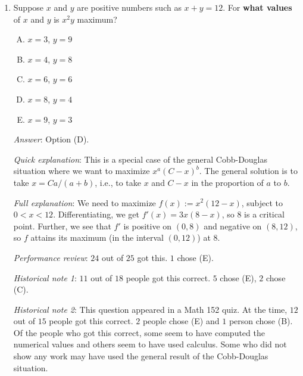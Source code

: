 \documentclass[10pt]{amsart}
\begin{document}
\begin{enumerate}
  {\em Performance review}: $15$ out of $25$ got this. $6$ chose (C),
  $2$ each chose (D) and (E).

  {\em Historical note 1}: $7$ out of $18$ people got this
  correct. $7$ chose (E), $2$ each chose (C) and (D).

  {\em Historical note 2}: This question appeared in a Math 152 quiz,
  and at the time $9$ out of $15$ people got this correct. $2$ people
  each chose (E) and (C), $1$ person chose (D), and $1$ person left
  the question blank.

  {\em Historical note 3}: This question appeared in a 152 midterm
  last year, and $20$ of $29$ people got it correct. In that midterm,
  option (E) wasn't there, so things became a little easier.


\item Suppose $x$ and $y$ are positive numbers such as $x + y =
  12$. For {\bf what values} of $x$ and $y$ is $x^2y$ maximum?

  \begin{enumerate}[(A)]
  \item $x = 3$, $y = 9$
  \item $x = 4$, $y = 8$
  \item $x = 6$, $y = 6$
  \item $x = 8$, $y = 4$
  \item $x = 9$, $y = 3$
  \end{enumerate}

  {\em Answer}: Option (D).

  {\em Quick explanation}: This is a special case of the general
  Cobb-Douglas situation where we want to maximize $x^a(C - x)^b$. The
  general solution is to take $x = Ca/(a + b)$, i.e., to take $x$ and
  $C - x$ in the proportion of $a$ to $b$.

  {\em Full explanation}: We need to maximize $f(x) := x^2(12 - x)$,
  subject to $0 < x < 12$. Differentiating, we get $f'(x) = 3x(8 -
  x)$, so $8$ is a critical point. Further, we see that $f'$ is
  positive on $(0,8)$ and negative on $(8,12)$, so $f$ attains its
  maximum (in the interval $(0,12)$) at $8$.

  {\em Performance review}: $24$ out of $25$ got this. $1$ chose (E).

  {\em Historical note 1}: $11$ out of $18$ people got this
  correct. $5$ chose (E), $2$ chose (C).

  {\em Historical note 2}: This question appeared in a Math 152 quiz. At
  the time, $12$ out of $15$ people got this correct. $2$ people chose
  (E) and $1$ person chose (B). Of the people who got this correct,
  some seem to have computed the numerical values and others seem to
  have used calculus. Some who did not show any work may have used the
  general result of the Cobb-Douglas situation.


\end{enumerate}
\end{document}
